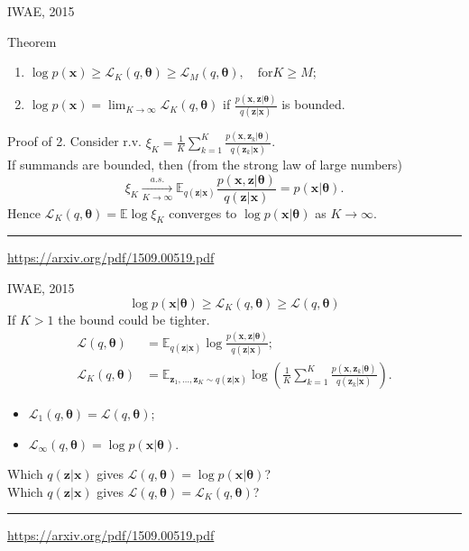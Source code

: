 \documentclass{beamer}
\newcommand{\bx}{\mathbf{x}}
\newcommand{\bz}{\mathbf{z}}
\newcommand{\btheta}{\boldsymbol{\theta}}
\begin{document}
\begin{frame}{IWAE, 2015}
    \begin{block}{Theorem}
\begin{enumerate}
    \item $\log p(\bx) \geq \mathcal{L}_K (q, \btheta) \geq \mathcal{L}_M (q, \btheta), \quad \text{for} K \geq M$;
    \item $\log p(\bx) = \lim_{K \rightarrow \infty} \mathcal{L}_K (q, \btheta)$ if $\frac{p(\bx, \bz | \btheta)}{q(\bz | \bx)}$ is bounded.
\end{enumerate}
\vspace{-0.2cm}
\end{block}
\begin{block}{Proof of 2.}
\vspace{0.2cm}
Consider r.v. $\xi_K = \frac{1}{K}\sum_{k=1}^K \frac{p(\bx, \bz_k | \btheta)}{q(\bz_k | \bx)}$. \\
\vspace{0.2cm}
If summands are bounded, then (from the strong law of large numbers)
\[
    \xi_K \xrightarrow[K \rightarrow \infty]{a.s.} \mathbb{E}_{q(\bz | \bx)} \frac{p(\bx, \bz | \btheta)}{q(\bz | \bx)} = p(\bx | \btheta).
\]
Hence $\mathcal{L}_K (q, \btheta) = \mathbb{E} \log \xi_K$ converges to $\log p(\bx | \btheta)$ as $K \rightarrow \infty$.
\end{block}
\vfill
\hrule\medskip
{\scriptsize \href{https://arxiv.org/pdf/1509.00519.pdf}{https://arxiv.org/pdf/1509.00519.pdf}}
\end{frame}
\begin{frame}{IWAE, 2015}
    \[
        \log p(\bx | \btheta) \geq \mathcal{L}_K(q, \btheta) \geq \mathcal{L}(q, \btheta)
    \]
    If $K > 1$ the bound could be tighter.
    \begin{align*}
        \mathcal{L} (q, \btheta) &= \mathbb{E}_{q(\bz | \bx)} \log \frac{p(\bx, \bz | \btheta)}{q(\bz| \bx)}; \\
        \mathcal{L}_K (q, \btheta) &= \mathbb{E}_{\bz_1, \dots, \bz_K \sim q(\bz | \bx)} \log \left( \frac{1}{K}\sum_{k=1}^K\frac{p(\bx, \bz_k | \btheta)}{q(\bz_k| \bx)} \right).
    \end{align*}
    \vspace{-0.2cm}
    \begin{itemize}
        \item $\mathcal{L}_1(q, \btheta) = \mathcal{L}(q, \btheta)$;
        \item $\mathcal{L}_{\infty}(q, \btheta) = \log p(\bx | \btheta)$.
    \end{itemize}
    \vspace{0.2cm}
    Which $q(\bz | \bx)$ gives $\mathcal{L}(q, \btheta) = \log p(\bx | \btheta)$? \\
    \vspace{0.2cm}
    Which $q(\bz | \bx)$ gives $\mathcal{L}(q, \btheta) = \mathcal{L}_K(q, \btheta)$?
\vfill
\hrule\medskip
{\scriptsize \href{https://arxiv.org/pdf/1509.00519.pdf}{https://arxiv.org/pdf/1509.00519.pdf}}
\end{frame}
\end{document}

